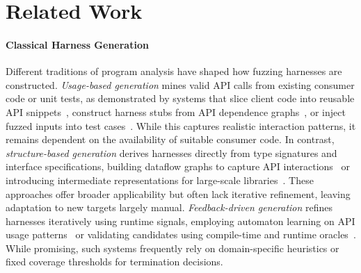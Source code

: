 \section{Related Work}
\label{sec:related-work}

\paragraph{Classical Harness Generation}
Different traditions of program analysis have shaped how fuzzing harnesses are constructed. \textit{Usage-based generation} mines valid API calls from existing consumer code or unit tests, as demonstrated by systems that slice client code into reusable API snippets~\cite{DBLP:conf/sigsoft/BabicBCIKKLSW19:FUDGE}, construct harness stubs from API dependence graphs~\cite{DBLP:conf/uss/IspoglouAMP20:FuzzGen}, or inject fuzzed inputs into test cases~\cite{DBLP:conf/sp/JeongJYMKJKSH23:UTopia}. While this captures realistic interaction patterns, it remains dependent on the availability of suitable consumer code. In contrast, \textit{structure-based generation} derives harnesses directly from type signatures and interface specifications, building dataflow graphs to capture API interactions~\cite{DBLP:conf/icse/GreenA22:GraphFuzz} or introducing intermediate representations for large-scale libraries~\cite{DBLP:journals/pacmse:ToffaliniBTP25:LibErator, DBLP:conf/icse/ShermanN25:OGHarn}. These approaches offer broader applicability but often lack iterative refinement, leaving adaptation to new targets largely manual. \textit{Feedback-driven generation} refines harnesses iteratively using runtime signals, employing automaton learning on API usage patterns~\cite{DBLP:conf/uss/ZhangLZZZZXLL0H23:Rubick} or validating candidates using compile-time and runtime oracles~\cite{DBLP:conf/icse:ShermanN25:OGHarn}. While promising, such systems frequently rely on domain-specific heuristics or fixed coverage thresholds for termination decisions.

